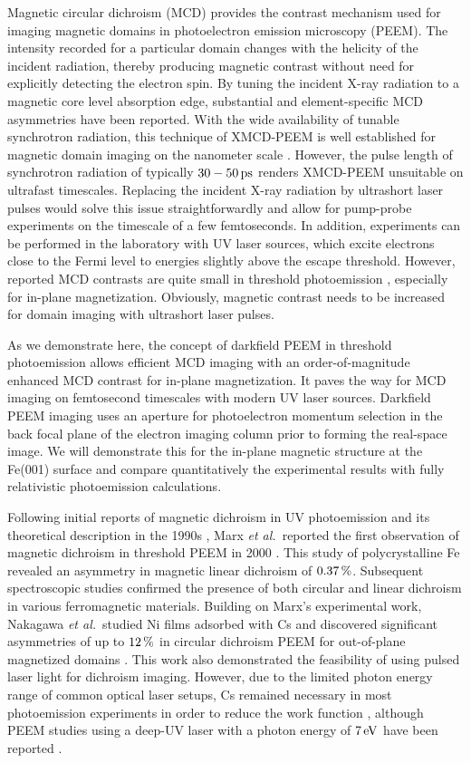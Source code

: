 \documentclass[prl,twocolumn,floatfix,superscriptaddress,aps]{revtex4-2}
\begin{document}
Magnetic circular dichroism (MCD) provides the contrast mechanism used for imaging magnetic domains in photoelectron emission microscopy (PEEM). The intensity recorded for a particular domain changes with the helicity of the incident radiation, thereby producing magnetic contrast without need for explicitly detecting the electron spin. By tuning the incident X-ray radiation to a magnetic core level absorption edge, substantial and element-specific MCD asymmetries have been reported. With the wide availability of tunable synchrotron radiation, this technique of XMCD-PEEM is well established for magnetic domain imaging on the nanometer scale \cite{kuch15}. However, the pulse length of synchrotron radiation of typically $\unit[30-50]{ps}$ renders XMCD-PEEM unsuitable on ultrafast timescales. Replacing the incident X-ray radiation by ultrashort laser pulses would solve this issue straightforwardly and allow for pump-probe experiments on the timescale of a  few femtoseconds. In addition, experiments can be performed in the laboratory with UV laser sources, which excite electrons close to the Fermi level to energies slightly above the escape threshold. However, reported MCD contrasts are quite small in threshold photoemission \cite{marx2000}, especially for in-plane magnetization. Obviously, magnetic contrast needs to be increased for domain imaging with ultrashort laser pulses.

As we demonstrate here, the concept of darkfield PEEM in threshold photoemission allows efficient MCD imaging with an order-of-magnitude enhanced MCD contrast for in-plane magnetization. It paves the way for MCD imaging on femtosecond timescales with modern UV laser sources. Darkfield PEEM imaging uses an aperture for photoelectron momentum selection in the back focal plane of the electron imaging column prior to forming the real-space image. We will demonstrate this for the in-plane magnetic structure at the Fe(001) surface and compare quantitatively the experimental results with fully relativistic photoemission calculations.

Following initial reports of magnetic dichroism in UV photoemission and its theoretical description in the 1990s \cite{schneider1991,henk1996,feder1996}, Marx \textit{et al.}\ reported the first observation of magnetic dichroism in threshold PEEM in 2000 \cite{marx2000}. This study of polycrystalline Fe revealed an asymmetry in magnetic linear dichroism of $\unit[0.37]{\%}$. Subsequent spectroscopic studies confirmed the presence of both circular and linear dichroism in various ferromagnetic materials. Building on Marx's experimental work, Nakagawa \textit{et al.}\ studied Ni films adsorbed with Cs and discovered significant asymmetries of up to $\unit[12]{\%}$ in circular dichroism PEEM for out-of-plane magnetized domains \cite{nakagawa2007,nakagawa2009,nakagawa2012}. This work also demonstrated the feasibility of using pulsed laser light for dichroism imaging. However, due to the limited photon energy range of common optical laser setups, Cs remained necessary in most photoemission experiments in order to reduce the work function \cite{kronseder2011, meier2017}, although PEEM studies using a deep-UV laser with a photon energy of $\unit[7]{eV}$ have been reported \cite{zhao2019}. 
\end{document}
